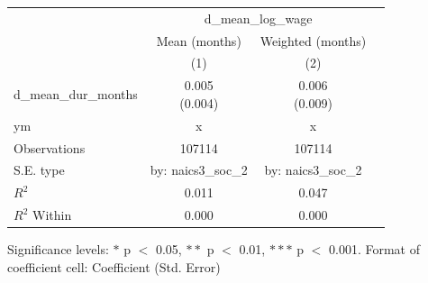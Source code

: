 \renewcommand\cellalign{t}
\begin{threeparttable}
\begin{tabular}{lccc}
\toprule
 & \multicolumn{2}{c}{d_mean_log_wage} \\
\cmidrule(lr){2-3} 
 & Mean (months) & Weighted (months) \\
 & (1) & (2) \\
\midrule
\addlinespace
d_mean_dur_months & \makecell{0.005 \\ (0.004)} & \makecell{0.006 \\ (0.009)} \\
\midrule
\addlinespace
ym & x & x \\
\midrule
\addlinespace
Observations & 107114 & 107114 \\
S.E. type & by: naics3_soc_2 & by: naics3_soc_2 \\
$R^2$ & 0.011 & 0.047 \\
$R^2$ Within & 0.000 & 0.000 \\
\bottomrule
\end{tabular}
\footnotesize Significance levels: $*$ p $<$ 0.05, $**$ p $<$ 0.01, $***$ p $<$ 0.001. Format of coefficient cell: Coefficient 
 (Std. Error)
\end{threeparttable}